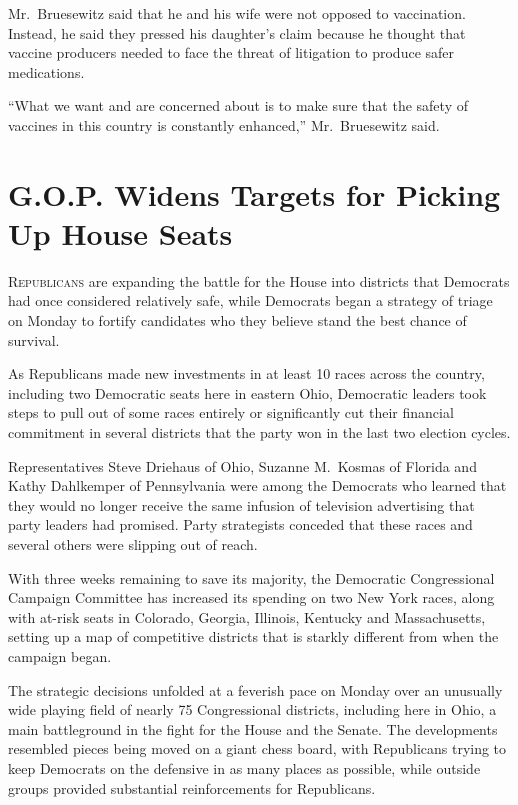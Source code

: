 ﻿\documentclass[12pt]{article}
\begin{document}
Mr.~Bruesewitz said that he and his wife were not opposed to vaccination. Instead, he said they
pressed his daughter's claim because he thought that vaccine producers needed to face the threat of
litigation to produce safer medications.

``What we want and are concerned about is to make sure that the safety of vaccines in this country
is constantly enhanced,'' Mr.~Bruesewitz said.

\section{G.O.P. Widens Targets for Picking Up House Seats}

\lettrine{R}{epublicans} are expanding the battle for the House into
districts that Democrats had once considered relatively safe, while Democrats began a strategy of
triage on Monday to fortify candidates who they believe stand the best chance of survival.

As Republicans made new investments in at least 10 races across the country, including two
Democratic seats here in eastern Ohio, Democratic leaders took steps to pull out of some races
entirely or significantly cut their financial commitment in several districts that the party won in
the last two election cycles.

Representatives Steve Driehaus of Ohio, Suzanne M.~Kosmas of Florida and Kathy Dahlkemper of
Pennsylvania were among the Democrats who learned that they would no longer receive the same
infusion of television advertising that party leaders had promised. Party strategists conceded that
these races and several others were slipping out of reach.

With three weeks remaining to save its majority, the Democratic Congressional Campaign Committee has
increased its spending on two New York races, along with at-risk seats in Colorado, Georgia,
Illinois, Kentucky and Massachusetts, setting up a map of competitive districts that is starkly
different from when the campaign began.

The strategic decisions unfolded at a feverish pace on Monday over an unusually wide playing field
of nearly 75 Congressional districts, including here in Ohio, a main battleground in the fight for
the House and the Senate. The developments resembled pieces being moved on a giant chess board, with
Republicans trying to keep Democrats on the defensive in as many places as possible, while outside
groups provided substantial reinforcements for Republicans.
\end{document}
